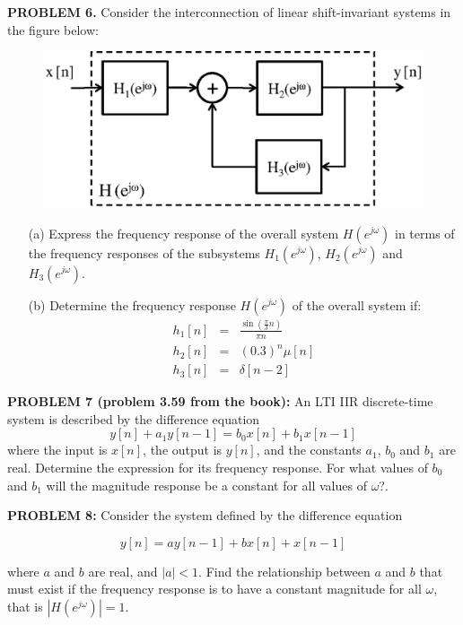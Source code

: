 \documentclass[11pt]{article}
\begin{document}
\textbf{PROBLEM 6.} Consider the interconnection of linear shift-invariant systems in the figure below:



\begin{figure}[h!]
\centering
\includegraphics[width=.7\textwidth]{fig5.eps}
\end{figure}



\begin{itemize}
\item[(a)] Express the frequency response of the overall system $H(e^{j\omega})$ in terms of the frequency responses of the subsystems $H_1(e^{j\omega})$, $H_2(e^{j\omega})$ and $H_3(e^{j\omega})$.
\item[(b)] Determine the frequency response $H(e^{j\omega})$ of the overall system if:
\[
\begin{array}{lll}
h_1[n] &=& \frac{\sin(\frac{\pi}{3}n)}{\pi n}\\
h_2[n] &=&(0.3)^{n}\mu[n]\\
h_3[n] &=&\delta[n-2]
\end{array}
\]
\end{itemize}


\vspace{1cm}
 


\textbf{PROBLEM 7 (problem 3.59 from the book):} An LTI IIR discrete-time system is described by the difference equation
\[
y[n] + a_1y[n-1] = b_0x[n]+b_1x[n-1]
\]
where the input is $x[n]$, the output is $y[n]$, and the constants $a_1$, $b_0$ and $b_1$ are real. Determine the expression for its frequency response. For what values of $b_0$ and $b_1$ will the magnitude response be a constant for all values of $\omega$?.




\vspace{1cm}




\textbf{PROBLEM 8:} Consider the system defined by the difference equation 

\[
y[n] = ay[n-1]+bx[n]+x[n-1]
\]

where $a$ and $b$ are real, and $|a|<1$. Find the relationship between $a$ and $b$ that must exist if the frequency response is to have a constant magnitude for all $\omega$, that is $|H(e^{j\omega})|=1$.
\vspace{1cm}
\end{document}
